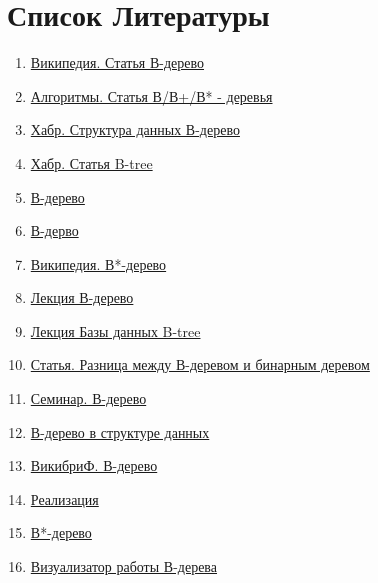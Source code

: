 \section{Список Литературы}
    \begin{enumerate}
        \item \href{https://ru.wikipedia.org/wiki/B-%D0%B4%D0%B5%D1%80%D0%B5%D0%B2%D0%BE#%D0%A1%D0%BC._%D1%82%D0%B0%D0%BA%D0%B6%D0%B5}{Википедия. Статья В-дерево}
        \item \href{http://algolist.manual.ru/ds/s_btr.php}{Алгоритмы. Статья В/В+/В* - деревья}
        \item \href{https://habr.com/ru/company/otus/blog/459216/}{Хабр. Структура данных В-дерево}
        \item \href{https://habr.com/ru/post/114154/}{Хабр. Статья B-tree}
        \item \href{https://codechick.io/tutorials/dsa/dsa-b-tree}{В-дерево}
        \item \href{https://neerc.ifmo.ru/wiki/index.php?title=B-%D0%B4%D0%B5%D1%80%D0%B5%D0%B2%D0%BE}{В-дерво}
        \item \href{https://ru.wikipedia.org/wiki/B*-%D0%B4%D0%B5%D1%80%D0%B5%D0%B2%D0%BE}{Википедия. В*-дерево}
        \item \href{https://www.youtube.com/watch?v=WXXetwePSRk&t=449s&ab_channel=VolodyaMozhenkov}{Лекция В-дерево}
        \item \href{https://www.youtube.com/watch?v=TdtulzNC9iE&ab_channel=SergeyNemchinskiy}{Лекция Базы данных B-tree}
        \item \href{https://ru.gadget-info.com/difference-between-b-tree}{Статья. Разница между В-деревом и бинарным деревом}
        \item \href{https://www.youtube.com/watch?v=eFS-0CojFik&ab_channel=%D0%9B%D0%B5%D0%BA%D1%82%D0%BE%D1%80%D0%B8%D0%B9%D0%A4%D0%9F%D0%9C%D0%98}{Семинар. В-дерево}
        \item \href{https://coderlessons.com/tutorials/kompiuternoe-programmirovanie/osnovy-algoritmov/4-b-derevo-v-strukture-dannykh}{В-дерево в структуре данных}
        \item \href{https://ru.wikibrief.org/wiki/B-tree}{ВикибриФ. В-дерево}
        \item \href{https://otus.ru/nest/post/1801/}{Реализация}
        \item \href{https://wp.wiki-wiki.ru/wp/index.php/B*-%D0%B4%D0%B5%D1%80%D0%B5%D0%B2%D0%BE}{В*-дерево}
        \item \href{https://www.cs.usfca.edu/~gal les/visualization/BTree.html}{Визуализатор работы В-дерева}

\end{enumerate}
